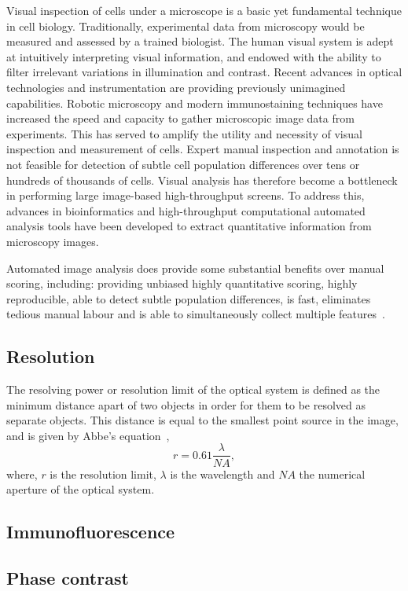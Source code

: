 Visual inspection of cells under a microscope is a basic yet fundamental technique in cell biology. Traditionally, experimental data from microscopy would be measured and assessed by a trained biologist. The human visual system is adept at intuitively interpreting visual information, and endowed with the ability to filter irrelevant variations in illumination and contrast. Recent advances in optical technologies and instrumentation are providing previously unimagined capabilities. Robotic microscopy and modern immunostaining techniques have increased the speed and capacity to gather microscopic image data from experiments. This has served to amplify the utility and necessity of visual inspection and measurement of cells. Expert manual inspection and annotation is not feasible for detection of subtle cell population differences over tens or hundreds of thousands of cells. Visual analysis has therefore become a bottleneck in performing large image-based high-throughput screens. To address this, advances in bioinformatics and high-throughput computational automated analysis tools have been developed to extract quantitative information from microscopy images.

Automated image analysis does provide some substantial benefits over manual scoring, including: providing unbiased highly quantitative scoring, highly reproducible, able to detect subtle population differences, is fast, eliminates tedious manual labour and is able to simultaneously collect multiple features~\cite{Jones2006}. 

\subsection{Resolution}
The resolving power or resolution limit of the optical system is defined as the minimum distance apart of two objects in order for them to be resolved as separate objects. This distance is equal to the smallest point source in the image, and is given by Abbe's equation~\cite{Abbe1873},
\begin{equation}
r=0.61\frac{\lambda}{NA},
\label{equation:abbe}
\end{equation}
where, $r$ is the resolution limit, $\lambda$ is the wavelength and $NA$ the numerical aperture of the optical system.


\subsection{Immunofluorescence}
\subsection{Phase contrast}

